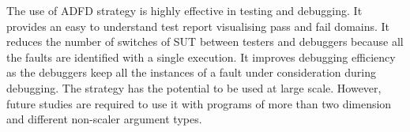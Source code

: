 The use of ADFD strategy is highly effective in testing and debugging. It provides an easy to understand test report visualising pass and fail domains. It reduces the number of switches of SUT between testers and debuggers because all the faults are identified with a single execution. It improves debugging efficiency as the debuggers keep all the instances of a fault under consideration during debugging. The strategy has the potential to be used at large scale. However, future studies are required to use it with programs of more than two dimension and different non-scaler argument types.








